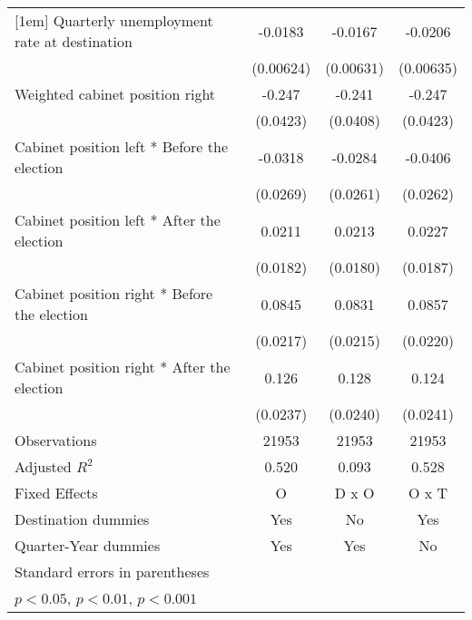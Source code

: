 \begin{table}[htbp]
\begin{tabular}{l*{3}{c}}
[1em]
Quarterly unemployment rate at destination&     -0.0183\sym{**} &     -0.0167\sym{*}  &     -0.0206\sym{**} \\
                    &   (0.00624)         &   (0.00631)         &   (0.00635)         \\
[1em]
Weighted cabinet position right&      -0.247\sym{***}&      -0.241\sym{***}&      -0.247\sym{***}\\
                    &    (0.0423)         &    (0.0408)         &    (0.0423)         \\
[1em]
Cabinet position left * Before the election&     -0.0318         &     -0.0284         &     -0.0406         \\
                    &    (0.0269)         &    (0.0261)         &    (0.0262)         \\
[1em]
Cabinet position left * After the election&      0.0211         &      0.0213         &      0.0227         \\
                    &    (0.0182)         &    (0.0180)         &    (0.0187)         \\
[1em]
Cabinet position right * Before the election&      0.0845\sym{***}&      0.0831\sym{***}&      0.0857\sym{***}\\
                    &    (0.0217)         &    (0.0215)         &    (0.0220)         \\
[1em]
Cabinet position right * After the election&       0.126\sym{***}&       0.128\sym{***}&       0.124\sym{***}\\
                    &    (0.0237)         &    (0.0240)         &    (0.0241)         \\
\hline
Observations        &       21953         &       21953         &       21953         \\
Adjusted \(R^{2}\)  &       0.520         &       0.093         &       0.528         \\
Fixed Effects       &           O         &       D x O         &       O x T         \\
Destination dummies &         Yes         &          No         &         Yes         \\
Quarter-Year dummies&         Yes         &         Yes         &          No         \\
\hline\hline
\multicolumn{4}{l}{\footnotesize Standard errors in parentheses}\\
\multicolumn{4}{l}{\footnotesize \sym{*} \(p<0.05\), \sym{**} \(p<0.01\), \sym{***} \(p<0.001\)}\\
\end{tabular}
\end{table}
